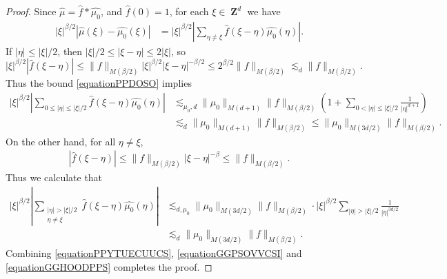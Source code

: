 \documentclass[dvipsnames,letterpaper,12pt]{article}
\numberwithin{equation}{section}
\DeclareMathOperator{\ZZ}{\mathbf{Z}}
\numberwithin{theorem}{section}
\begin{document}
\begin{proof}
    Since $\widehat{\mu} = \widehat{f} * \widehat{\mu_0}$, and $\widehat{f}(0) = 1$, for each $\xi \in \ZZ^d$ we have
    \begin{equation} \label{equationPPYTUECUUCS}
    \begin{split}
        |\xi|^{\beta/2} |\widehat{\mu}(\xi) - \widehat{\mu_0}(\xi)| &= |\xi|^{\beta/2} \left| \sum_{\eta \neq \xi} \widehat{f}(\xi - \eta) \widehat{\mu_0}(\eta) \right|.
    \end{split}
    \end{equation}
    If $|\eta| \leq |\xi|/2$, then $|\xi|/2 \leq |\xi - \eta| \leq 2 |\xi|$, so
    \begin{equation} \label{equationPPDOSO}
        |\xi|^{\beta/2} |\widehat{f}(\xi - \eta)| \leq \| f \|_{M(\beta/2)} |\xi|^{\beta/2} |\xi-\eta|^{-\beta/2} \leq 2^{\beta/2} \| f \|_{M(\beta/2)} \lesssim_d \| f \|_{M(\beta/2)}.
    \end{equation}
    Thus the bound \eqref{equationPPDOSO} implies
    \begin{equation} \label{equationGGPSOVVCSI}
    \begin{split}
        |\xi|^{\beta/2} \left| \sum_{0 \leq |\eta| \leq |\xi|/2} \widehat{f}(\xi - \eta) \widehat{\mu_0}(\eta) \right| &\lesssim_{\mu_0,d} \| \mu_0 \|_{M(d+1)} \| f \|_{M(\beta/2)} \left( 1 + \sum_{0 < |\eta| \leq |\xi|/2} \frac{1}{|\eta|^{d+1}} \right)\\
        &\lesssim_d \| \mu_0 \|_{M(d+1)} \| f \|_{M(\beta/2)} \leq \| \mu_0 \|_{M(3d/2)} \| f \|_{M(\beta/2)}.
    \end{split}
    \end{equation}
    On the other hand, for all $\eta \neq \xi$,
    \begin{equation} \label{equationGGDPSOX}
    \begin{split}
        |\widehat{f}(\xi - \eta)| \leq  \| f \|_{M(\beta/2)} |\xi - \eta|^{-\beta} \leq \| f \|_{M(\beta/2)}.
    \end{split}
    \end{equation}
    Thus we calculate that
    \begin{equation} \label{equationGGHOODPPS}
    \begin{split}
        |\xi|^{\beta/2} \left| \sum_{\substack{|\eta| > |\xi|/2\\ \eta \neq \xi}} \widehat{f}(\xi - \eta) \widehat{\mu_0}(\eta) \right| &\lesssim_{d,\mu_0} \| \mu_0 \|_{M(3d/2)} \| f \|_{M(\beta/2)} \cdot |\xi|^{\beta/2} \sum_{|\eta| > |\xi|/2} \frac{1}{|\eta|^{3d/2}}\\
        &\lesssim_d \| \mu_0 \|_{M(3d/2)} \| f \|_{M(\beta/2)}.
    \end{split}
    \end{equation}
    Combining \eqref{equationPPYTUECUUCS}, \eqref{equationGGPSOVVCSI} and \eqref{equationGGHOODPPS} completes the proof.
\end{proof}
\end{document}
